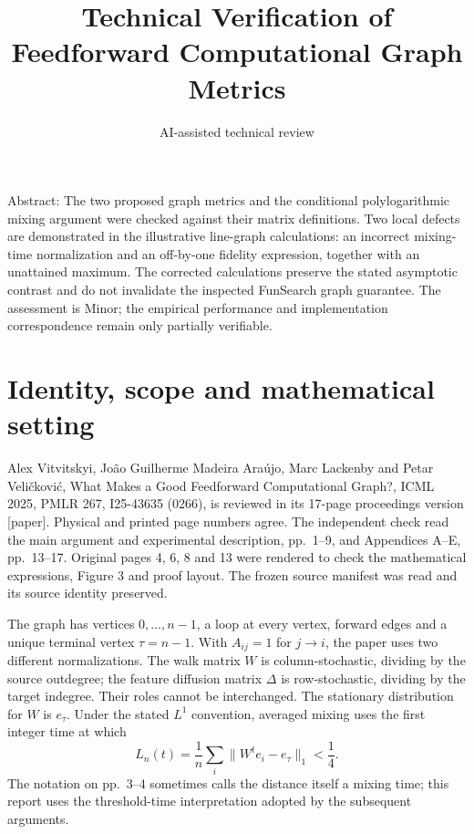 \documentclass[10pt]{article}
\title{Technical Verification of Feedforward Computational Graph Metrics}
\author{AI-assisted technical review}
\date{}
\begin{document}
\maketitle
Abstract: The two proposed graph metrics and the conditional polylogarithmic mixing argument were checked against their matrix definitions. Two local defects are demonstrated in the illustrative line-graph calculations: an incorrect mixing-time normalization and an off-by-one fidelity expression, together with an unattained maximum. The corrected calculations preserve the stated asymptotic contrast and do not invalidate the inspected FunSearch graph guarantee. The assessment is Minor; the empirical performance and implementation correspondence remain only partially verifiable.\par
\section*{Identity, scope and mathematical setting}
Alex Vitvitskyi, João Guilherme Madeira Araújo, Marc Lackenby and Petar Veličković, What Makes a Good Feedforward Computational Graph?, ICML 2025, PMLR 267, I25-43635 (0266), is reviewed in its 17-page proceedings version [paper]. Physical and printed page numbers agree. The independent check read the main argument and experimental description, pp. 1–9, and Appendices A–E, pp. 13–17. Original pages 4, 6, 8 and 13 were rendered to check the mathematical expressions, Figure 3 and proof layout. The frozen source manifest was read and its source identity preserved.\par
The graph has vertices \(0,\ldots,n-1\), a loop at every vertex, forward edges and a unique terminal vertex \(\tau=n-1\). With \(A_{ij}=1\) for \(j\to i\), the paper uses two different normalizations. The walk matrix \(W\) is column-stochastic, dividing by the source outdegree; the feature diffusion matrix \(\Delta\) is row-stochastic, dividing by the target indegree. Their roles cannot be interchanged. The stationary distribution for \(W\) is \(e_\tau\). Under the stated \(L^1\) convention, averaged mixing uses the first integer time at which \[L_n(t)=\frac1n\sum_i\|W^te_i-e_\tau\|_1<\frac14.\] The notation on pp. 3–4 sometimes calls the distance itself a mixing time; this report uses the threshold-time interpretation adopted by the subsequent arguments.\par
\end{document}
